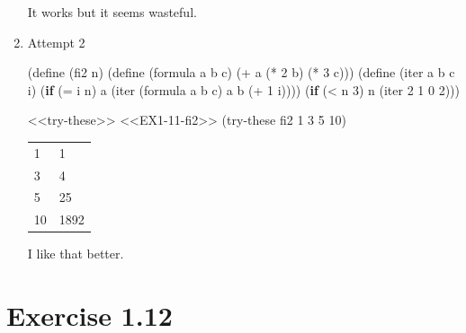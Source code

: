 \documentclass[
]{article}
\newenvironment{Shaded}{}{}
\newcommand{\DecValTok}[1]{\textcolor[rgb]{0.25,0.63,0.44}{#1}}
\newcommand{\ExtensionTok}[1]{#1}
\newcommand{\FunctionTok}[1]{\textcolor[rgb]{0.02,0.16,0.49}{#1}}
\newcommand{\KeywordTok}[1]{\textcolor[rgb]{0.00,0.44,0.13}{\textbf{#1}}}
\newcommand{\NormalTok}[1]{#1}
\newcommand{\OperatorTok}[1]{\textcolor[rgb]{0.40,0.40,0.40}{#1}}
\begin{document}
\begin{enumerate}
  It works but it seems wasteful.
\item
  Attempt 2

\hypertarget{EX1-11-fi2}{%
\label{EX1-11-fi2}}%
\begin{Shaded}
\begin{Highlighting}[numbers=left,,]
\NormalTok{(}\ExtensionTok{define}\FunctionTok{ }\NormalTok{(fi2 n)}
\NormalTok{  (}\ExtensionTok{define}\FunctionTok{ }\NormalTok{(formula a b c)}
\NormalTok{      (}\OperatorTok{+}\NormalTok{ a}
\NormalTok{         (}\OperatorTok{*} \DecValTok{2}\NormalTok{ b)}
\NormalTok{         (}\OperatorTok{*} \DecValTok{3}\NormalTok{ c)))}
\NormalTok{  (}\ExtensionTok{define}\FunctionTok{ }\NormalTok{(iter a b c i)}
\NormalTok{    (}\KeywordTok{if}\NormalTok{ (}\OperatorTok{=}\NormalTok{ i n)}
\NormalTok{        a}
\NormalTok{        (iter (formula a b c)}
\NormalTok{              a}
\NormalTok{              b}
\NormalTok{              (}\OperatorTok{+} \DecValTok{1}\NormalTok{ i))))}
\NormalTok{  (}\KeywordTok{if}\NormalTok{ (}\OperatorTok{\textless{}}\NormalTok{ n }\DecValTok{3}\NormalTok{)}
\NormalTok{      n}
\NormalTok{      (iter }\DecValTok{2} \DecValTok{1} \DecValTok{0} \DecValTok{2}\NormalTok{)))}
\end{Highlighting}
\end{Shaded}

\begin{Shaded}
\begin{Highlighting}[numbers=left,,]
\NormalTok{\textless{}\textless{}try{-}these\textgreater{}\textgreater{}}
\NormalTok{\textless{}\textless{}EX1{-}11{-}fi2\textgreater{}\textgreater{}}
\NormalTok{(try{-}these fi2 }\DecValTok{1} \DecValTok{3} \DecValTok{5} \DecValTok{10}\NormalTok{)}
\end{Highlighting}
\end{Shaded}

  \begin{longtable}[]{@{}ll@{}}
  \toprule
  \endhead
  1 & 1 \\
  3 & 4 \\
  5 & 25 \\
  10 & 1892 \\
  \bottomrule
  \end{longtable}

  I like that better.
\end{enumerate}

\hypertarget{exercise-1.12}{%
\section{Exercise 1.12}\label{exercise-1.12}}
\end{document}
